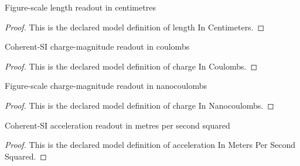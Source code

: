 \begin{definition}
  \label{def:physics:phyx-mini-0891:phyxminiproblems-problemphyxmini0891-lengthincentimeters}
  Figure-scale length readout in centimetres
\end{definition}
\begin{proof}
  This is the declared model definition of length In Centimeters.
\end{proof}
\begin{definition}
  \label{def:physics:phyx-mini-0891:phyxminiproblems-problemphyxmini0891-chargeincoulombs}
  Coherent-SI charge-magnitude readout in coulombs
\end{definition}
\begin{proof}
  This is the declared model definition of charge In Coulombs.
\end{proof}
\begin{definition}
  \label{def:physics:phyx-mini-0891:phyxminiproblems-problemphyxmini0891-chargeinnanocoulombs}
  Figure-scale charge-magnitude readout in nanocoulombs
\end{definition}
\begin{proof}
  This is the declared model definition of charge In Nanocoulombs.
\end{proof}
\begin{definition}
  \label{def:physics:phyx-mini-0891:phyxminiproblems-problemphyxmini0891-accelerationinmeterspersecondsquared}
  Coherent-SI acceleration readout in metres per second squared
\end{definition}
\begin{proof}
  This is the declared model definition of acceleration In Meters Per Second Squared.
\end{proof}
